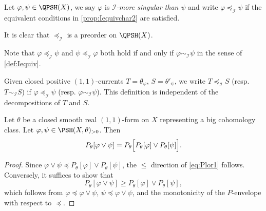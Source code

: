 \begin{definition}\label{def:Imoresing}
    Let $\varphi,\psi\in \QPSH(X)$, we say $\varphi$ is \emph{$\mathcal{I}$-more singular than $\psi$} and write $\varphi\preceq_{\mathcal{I}} \psi$ if the equivalent conditions in \cref{prop:Iequivchar2} are satisfied.
\end{definition}
It is clear that $\preceq_{\mathcal{I}}$ is a preorder on $\QPSH(X)$.

Note that $\varphi\preceq_{\mathcal{I}}\psi$ and $\psi\preceq_{\mathcal{I}}\varphi$ both hold if and only if $\varphi\sim_{\mathcal{I}}\psi$ in the sense of \cref{def:Iequiv}.

Given closed positive $(1,1)$-currents $T=\theta_{\varphi}$, $S=\theta'_{\psi}$, we write $T\preceq_{\mathcal{I}} S$ (resp. $T\sim_{\mathcal{I}} S$) if $\varphi\preceq_{\mathcal{I}} \psi$ (resp. $\varphi\sim_{\mathcal{I}} \psi$). This definition is independent of the decompositions of $T$ and $S$.

\begin{lemma}\label{lma:Plor1}
    Let $\theta$ be a closed smooth real $(1,1)$-form on $X$ representing a big cohomology class.
    Let $\varphi,\psi\in \PSH(X,\theta)_{>0}$. Then
    \begin{equation}\label{eq:Plor1}
    P_{\theta}[\varphi\lor \psi]=P_{\theta}\Bigl[ P_{\theta}[\varphi]\lor P_{\theta}[\psi] \Bigr].
    \end{equation}
\end{lemma}
\begin{proof}
    Since $\varphi\lor \psi\preceq P_{\theta}[\varphi]\lor P_{\theta}[\psi]$, the $\leq$ direction of \eqref{eq:Plor1} follows. Conversely, it suffices to show that
    \[
    P_{\theta}[\varphi\lor \psi]\geq P_{\theta}[\varphi]\lor P_{\theta}[\psi],
    \]
    which follows from $\varphi\preceq\varphi\lor\psi$, $\psi\preceq\varphi\lor\psi$, and the monotonicity of the $P$-envelope with respect to $\preceq$.
\end{proof}


